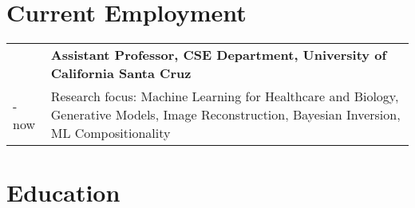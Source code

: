 \documentclass[a4paper,10pt]{article} %
\begin{document}
\vspace{-0.5em}


\section*{Current Employment}

\begin{tabular}{>{\raggedleft\arraybackslash} p{0.93cm}|p{15.7cm}}
2022 & \large\textbf{Assistant Professor, CSE Department, University of California Santa Cruz} \\
- now & Research focus: Machine Learning for Healthcare and Biology, Generative Models, Image Reconstruction, Bayesian Inversion, ML Compositionality\\
\end{tabular}


\section*{Education}
\end{document}

